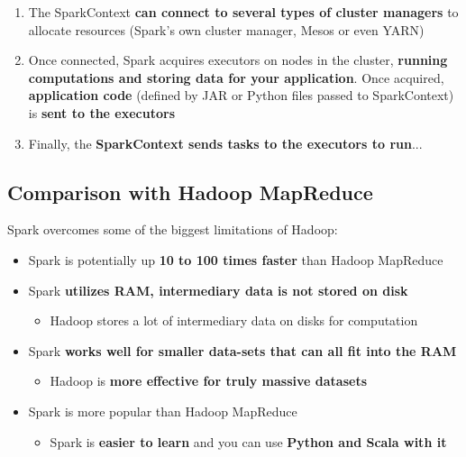 \documentclass{beamer}[10pt, usepdftitle=false handout]
\begin{document}
\begin{frame}
	\begin{enumerate}
	\item{The SparkContext \textbf{can connect to several types of cluster managers} to allocate resources (Spark’s own cluster manager, Mesos or even YARN)}
	\item{Once connected, Spark acquires executors on nodes in the cluster, \textbf{running computations and storing data for your application}. Once acquired, \textbf{application code} (defined by JAR or Python files passed to SparkContext) is \textbf{sent to the executors}}
	\item{Finally, the \textbf{SparkContext sends tasks to the executors to run}...}
	\end{enumerate}

\end{frame}



\subsection{Comparison with Hadoop MapReduce}

\begin{frame}
Spark overcomes some of the biggest limitations of Hadoop:
\vspace*{0.6em}

\begin{itemize}
\item{Spark is potentially up \textbf{10 to 100 times faster} than Hadoop MapReduce}
\item{Spark \textbf{utilizes RAM, intermediary data is not stored on disk} 
\begin{itemize}
\item{Hadoop stores a lot of intermediary data on disks for computation}
\end{itemize}}

\item{Spark \textbf{works well for smaller data-sets that can all fit into the RAM} 
\begin{itemize}
\item{Hadoop is \textbf{more effective for truly massive datasets}}
\end{itemize}
}
\item{Spark is more popular than Hadoop MapReduce 
\begin{itemize}
\item{Spark is \textbf{easier to learn} and you can use \textbf{Python and Scala with it}}
\end{itemize}}
\end{itemize}
 

\end{frame}
\end{document}
